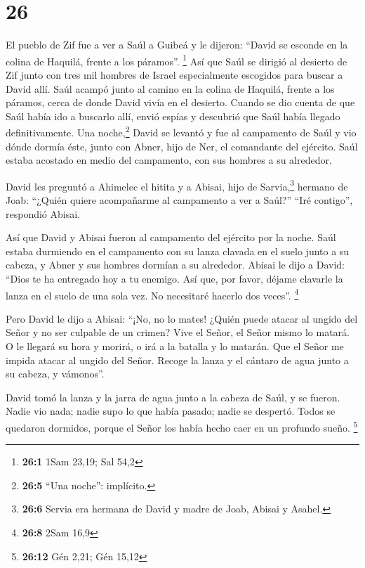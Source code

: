 \hypertarget{section-25}{%
\section{26}\label{section-25}}

 El pueblo de Zif fue a ver a Saúl a Guibeá y le dijeron:
``David se esconde en la colina de Haquilá, frente a los páramos''.
\footnote{\textbf{26:1} 1Sam 23,19; Sal 54,2}  Así que
Saúl se dirigió al desierto de Zif junto con tres mil hombres de Israel
especialmente escogidos para buscar a David allí.  Saúl
acampó junto al camino en la colina de Haquilá, frente a los páramos,
cerca de donde David vivía en el desierto. Cuando se dio cuenta de que
Saúl había ido a buscarlo allí,  envió espías y descubrió
que Saúl había llegado definitivamente.  Una
noche,\footnote{\textbf{26:5} ``Una noche'': implícito.} David se
levantó y fue al campamento de Saúl y vio dónde dormía éste, junto con
Abner, hijo de Ner, el comandante del ejército. Saúl estaba acostado en
medio del campamento, con sus hombres a su alrededor.

 David les preguntó a Ahimelec el hitita y a Abisai, hijo
de Sarvia,\footnote{\textbf{26:6} Servia era hermana de David y madre de
  Joab, Abisai y Asahel.} hermano de Joab: ``¿Quién quiere acompañarme
al campamento a ver a Saúl?'' ``Iré contigo'', respondió Abisai.

 Así que David y Abisai fueron al campamento del ejército
por la noche. Saúl estaba durmiendo en el campamento con su lanza
clavada en el suelo junto a su cabeza, y Abner y sus hombres dormían a
su alrededor.  Abisai le dijo a David: ``Dios te ha
entregado hoy a tu enemigo. Así que, por favor, déjame clavarle la lanza
en el suelo de una sola vez. No necesitaré hacerlo dos veces''.
\footnote{\textbf{26:8} 2Sam 16,9}

 Pero David le dijo a Abisai: ``¡No, no lo mates! ¿Quién
puede atacar al ungido del Señor y no ser culpable de un crimen?
 Vive el Señor, el Señor mismo lo matará. O le llegará su
hora y morirá, o irá a la batalla y lo matarán.  Que el
Señor me impida atacar al ungido del Señor. Recoge la lanza y el cántaro
de agua junto a su cabeza, y vámonos''.

 David tomó la lanza y la jarra de agua junto a la cabeza
de Saúl, y se fueron. Nadie vio nada; nadie supo lo que había pasado;
nadie se despertó. Todos se quedaron dormidos, porque el Señor los había
hecho caer en un profundo sueño. \footnote{\textbf{26:12} Gén 2,21; Gén
  15,12}

